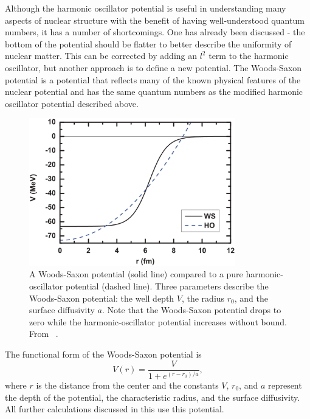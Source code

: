 Although the harmonic oscillator potential is useful in understanding many aspects of nuclear structure with the benefit of having well-understood quantum numbers, it has a number of shortcomings.  One has already been discussed - the bottom of the potential should be flatter to better describe the uniformity of nuclear matter.  This can be corrected by adding an $l^2$ term to the harmonic oscillator, but another approach is to define a new potential.  The Woods-Saxon potential \cite{WoodsSaxon} is a potential that reflects many of the known physical features of the nuclear potential and has the same quantum numbers as the modified harmonic oscillator potential described above.
\begin{figure}[htp]
\centering
\includegraphics[width=0.8\textwidth]{figures/woodsSaxonVSharmonicOsc.eps}
\caption{A Woods-Saxon potential (solid line) compared to a pure harmonic-oscillator potential (dashed line).  Three parameters describe the Woods-Saxon potential: the well depth $V$, the radius $r_0$, and the surface diffusivity $a$.  Note that the Woods-Saxon potential drops to zero while the harmonic-oscillator potential increases without bound.  From {}~\cite{pseudospinSymmetry}.}
\label{fig:woodsSaxon}
\end{figure}
The functional form of the Woods-Saxon potential is 
\begin{equation}
V(r) = \frac{V}{1+e^{(r-r_0)/a}},
\end{equation}
where $r$ is the distance from the center and the constants $V$, $r_0$, and $a$ represent the depth of the potential, the characteristic radius, and the surface diffusivity.  All further calculations discussed in this use this potential.

